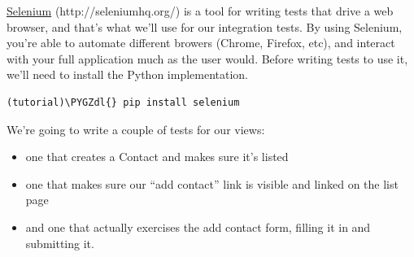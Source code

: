 \documentclass[letterpaper,10pt,english]{sphinxmanual}
\def\PYGZdl{\char`\$}
\begin{document}
\href{http://seleniumhq.org/}{Selenium} (http://seleniumhq.org/) is a tool for writing tests that drive a web browser, and
that's what we'll use for our integration tests. By using Selenium,
you're able to automate different browers (Chrome, Firefox, etc), and
interact with your full application much as the user would. Before
writing tests to use it, we'll need to install the Python implementation.

\begin{Verbatim}[commandchars=\\\{\}]
(tutorial)\PYGZdl{} pip install selenium
\end{Verbatim}

We're going to write a couple of tests for our views:
\begin{itemize}
\item {} 
one that creates a Contact and makes sure it's listed

\item {} 
one that makes sure our ``add contact'' link is visible and linked on
the list page

\item {} 
and one that actually exercises the add contact form, filling it in
and submitting it.

\end{itemize}
\end{document}
